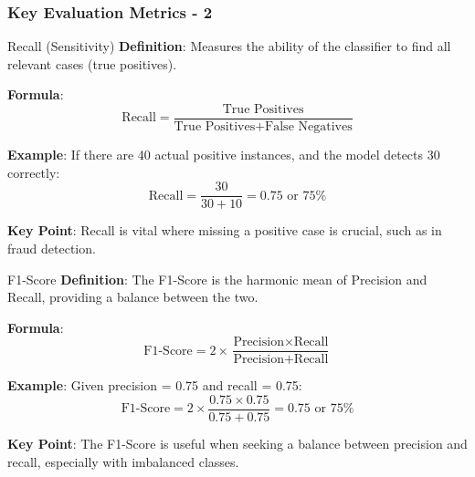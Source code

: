 \documentclass[aspectratio=169]{beamer}
\begin{document}
\begin{frame}[fragile]
    \frametitle{Key Evaluation Metrics - 2}
    \begin{block}{Recall (Sensitivity)}
        \textbf{Definition}: Measures the ability of the classifier to find all relevant cases (true positives).

        \textbf{Formula}:
        \begin{equation}
            \text{Recall} = \frac{\text{True Positives}}{\text{True Positives} + \text{False Negatives}}
        \end{equation}

        \textbf{Example}: 
        If there are 40 actual positive instances, and the model detects 30 correctly:
        \begin{equation}
            \text{Recall} = \frac{30}{30 + 10} = 0.75 \text{ or } 75\%
        \end{equation}

        \textbf{Key Point}: Recall is vital where missing a positive case is crucial, such as in fraud detection.
    \end{block}

    \begin{block}{F1-Score}
        \textbf{Definition}: The F1-Score is the harmonic mean of Precision and Recall, providing a balance between the two.

        \textbf{Formula}:
        \begin{equation}
            \text{F1-Score} = 2 \times \frac{\text{Precision} \times \text{Recall}}{\text{Precision} + \text{Recall}}
        \end{equation}

        \textbf{Example}: Given precision = 0.75 and recall = 0.75:
        \begin{equation}
            \text{F1-Score} = 2 \times \frac{0.75 \times 0.75}{0.75 + 0.75} = 0.75 \text{ or } 75\%
        \end{equation}

        \textbf{Key Point}: The F1-Score is useful when seeking a balance between precision and recall, especially with imbalanced classes.
    \end{block}
\end{frame}
\end{document}
